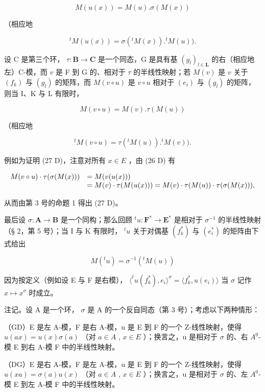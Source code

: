\[
M (u (x)) = M (u). \sigma (M (x))\tag{26 D}
\]

（相应地

\[
{ } ^ { t } M ( u ( x ) ) = \sigma ( { } ^ { t } M ( x ) ) . { } ^ { t } M ( u ) ) .\tag{26 G}
\]

设 C 是第三个环， \(\tau: \mathbf{B} \to \mathbf{C}\) 是一个同态，G 是具有基 \((g_l)_{l \in \mathbf{L}}\) 的右（相应地左）C-模，而 \(v\) 是 F 到 G 的、相对于 \(\tau\) 的半线性映射；若 \(M(v)\) 是 \(v\) 关于 \((f_k)\) 与 \((g_l)\) 的矩阵，而 \(M(v \circ u)\) 是 \(v \circ u\) 相对于 \((e_i)\) 与 \((g_l)\) 的矩阵，则当 I、K 与 L 有限时，

\[
M (v \circ u) = M (v). \tau (M (u))\tag{27 D}
\]

（相应地

\[
{ } ^ { t } M ( v \circ u ) = \tau ( { } ^ { t } M ( u ) ) . { } ^ { t } M ( v ) ) .\tag{27 G}
\]

例如为证明 (27 D)，注意对所有 \(x \in E\) ，由 (26 D) 有

\[
\begin{array}{r l} M (v \circ u) \cdot \tau (\sigma (M (x))) & = M (v (u (x))) \\ & = M (v) \cdot \tau (M (u (x))) = M (v) \cdot \tau (M (u)) \cdot \tau (\sigma (M (x))), \end{array}
\]

从而由第 3 号的命题 1 得出 (27 D)。

最后设 \(\sigma: \mathbf{A} \to \mathbf{B}\) 是一个同构；那么回顾 \(^t u: \mathbf{F}^* \to \mathbf{E}^*\) 是相对于 \(\sigma^{-1}\) 的半线性映射（§ 2，第 5 号）；当 I 与 K 有限时， \(^t u\) 关于对偶基 \((f_k^*)\) 与 \((e_i^*)\) 的矩阵由下式给出

\[
M (^ {t} u) = \sigma^ {- 1} (^ {t} M (u))\tag{28}
\]

因为按定义（例如设 E 与 F 是右模）， \(\langle^t u(f_k^*), e_i \rangle^\sigma = \langle f_k^*, u(e_i) \rangle\) 当 \(\sigma\) 记作 \(x \mapsto x^\sigma\) 时成立。

注记。设 A 是一个环， \(\sigma\) 是 A 的一个反自同态（第 3 号）；考虑以下两种情形：

（GD）E 是左 A-模，F 是右 A-模，u 是 E 到 F 的一个 Z-线性映射，使得 \(u(ax) = u(x)\sigma(a)\) （对 \(a \in A\) , \(x \in E\) ）；换言之，u 是相对于 \(\sigma\) 的、右 \(A^{0}\)-模 E 到右 A-模 F 中的半线性映射。

（DG）E 是右 A-模，F 是左 A-模，u 是 E 到 F 的一个 Z-线性映射，使得 \(u(xa) = \sigma(a)u(x)\) （对 \(a \in A\) , \(x \in E\) ）；换言之，u 是相对于 \(\sigma\) 的、左 \(A^{0}\)-模 E 到左 A-模 F 中的半线性映射。

